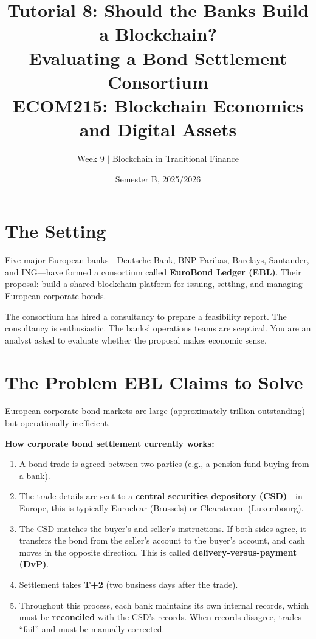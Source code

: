 \documentclass[11pt]{article}
\title{Tutorial 8: Should the Banks Build a Blockchain?\\[0.3em] \Large Evaluating a Bond Settlement Consortium\\[1em] \normalsize ECOM215: Blockchain Economics and Digital Assets}
\author{Week 9 $\vert$ Blockchain in Traditional Finance}
\date{Semester B, 2025/2026}
\begin{document}
\maketitle

\vspace{1em}
\begin{center}
\end{center}

\section*{The Setting}

Five major European banks---Deutsche Bank, BNP Paribas, Barclays, Santander, and ING---have formed a consortium called \textbf{EuroBond Ledger (EBL)}. Their proposal: build a shared blockchain platform for issuing, settling, and managing European corporate bonds.

The consortium has hired a consultancy to prepare a feasibility report. The consultancy is enthusiastic. The banks' operations teams are sceptical. You are an analyst asked to evaluate whether the proposal makes economic sense.

\section*{The Problem EBL Claims to Solve}

European corporate bond markets are large (approximately  trillion outstanding) but operationally inefficient.

\medskip
\noindent\textbf{How corporate bond settlement currently works:}
\begin{enumerate}[leftmargin=*]
\item A bond trade is agreed between two parties (e.g., a pension fund buying from a bank).
\item The trade details are sent to a \textbf{central securities depository (CSD)}---in Europe, this is typically Euroclear (Brussels) or Clearstream (Luxembourg).
\item The CSD matches the buyer's and seller's instructions. If both sides agree, it transfers the bond from the seller's account to the buyer's account, and cash moves in the opposite direction. This is called \textbf{delivery-versus-payment (DvP)}.
\item Settlement takes \textbf{T+2} (two business days after the trade).
\item Throughout this process, each bank maintains its own internal records, which must be \textbf{reconciled} with the CSD's records. When records disagree, trades ``fail'' and must be manually corrected.
\end{enumerate}
\end{document}
